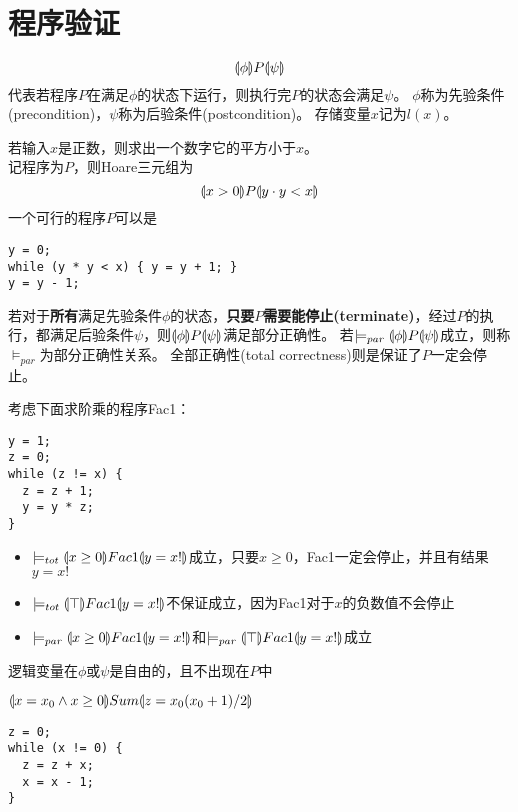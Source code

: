 
\section{程序验证}
\begin{definition}
\[\llparenthesis \phi\rrparenthesis P\llparenthesis \psi\rrparenthesis\]
代表若程序$P$在满足$\phi$的状态下运行，则执行完$P$的状态会满足$\psi$。
$\phi$称为先验条件(precondition)，$\psi$称为后验条件(postcondition)。
存储变量$x$记为$l(x)$。
\end{definition}
\begin{example}
若输入$x$是正数，则求出一个数字它的平方小于$x$。\\
记程序为$P$，则Hoare三元组为
\[\llparenthesis x>0\rrparenthesis P\llparenthesis y\cdot y<x\rrparenthesis\]
一个可行的程序$P$可以是
\begin{lstlisting}
y = 0;
while (y * y < x) { y = y + 1; }
y = y - 1;
\end{lstlisting}
\end{example}
\begin{definition}
若对于\textbf{所有}满足先验条件$\phi$的状态，\textbf{只要$P$需要能停止(terminate)}，经过$P$的执行，都满足后验条件$\psi$，则$\llparenthesis \phi\rrparenthesis P\llparenthesis \psi\rrparenthesis$满足部分正确性。
若$\models_{par}\llparenthesis \phi\rrparenthesis P\llparenthesis \psi\rrparenthesis$成立，则称$\models_{par}$为部分正确性关系。
全部正确性(total correctness)则是保证了$P$一定会停止。
\end{definition}
\begin{example}
考虑下面求阶乘的程序Fac1：
\begin{lstlisting}
y = 1;
z = 0;
while (z != x) {
  z = z + 1;
  y = y * z;
}
\end{lstlisting}
\begin{itemize}
\item $\models_{tot}\llparenthesis x \geq 0 \rrparenthesis Fac1\llparenthesis y = x! \rrparenthesis$成立，只要$x \geq 0$，Fac1一定会停止，并且有结果$y = x!$
\item $\models_{tot}\llparenthesis \top \rrparenthesis Fac1\llparenthesis y = x! \rrparenthesis$不保证成立，因为Fac1对于$x$的负数值不会停止
\item $\models_{par}\llparenthesis x \geq 0 \rrparenthesis Fac1\llparenthesis y = x! \rrparenthesis$和$\models_{par}\llparenthesis \top\rrparenthesis Fac1\llparenthesis y = x!\rrparenthesis$成立
\end{itemize}
\end{example}
\begin{definition}
逻辑变量在$\phi$或$\psi$是自由的，且不出现在$P$中
\end{definition}
\begin{example}
$\llparenthesis x=x_0\land x\geq 0\rrparenthesis Sum\llparenthesis z=x_0(x_0+1)/2\rrparenthesis$
\begin{lstlisting}
z = 0;
while (x != 0) {
  z = z + x;
  x = x - 1;
}
\end{lstlisting}
\end{example}

